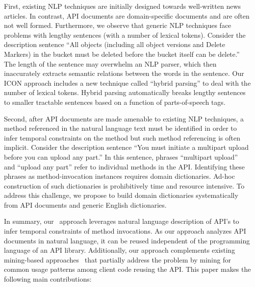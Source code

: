 First, existing NLP techniques are initially designed towards well-written news articles.
In contrast, API documents are domain-specific documents and are often not well formed.
Furthermore, we observe that generic NLP techniques face problems with lengthy sentences (with a number of lexical tokens).
Consider the description sentence ``All objects (including all object versions and Delete Markers) in the bucket must be deleted before the bucket itself can be delete.'' The length of the sentence may overwhelm an NLP parser, which then inaccurately extracts semantic relations between the words in the sentence.
Our ICON approach includes a new technique called ``hybrid parsing'' to deal with the number of lexical tokens.
Hybrid parsing automatically breaks lengthy sentences to smaller tractable sentences based on a function of parts-of-speech tags.   

Second, after API documents are made amenable to existing NLP techniques, a method referenced in the natural language text must be identified in order to infer temporal constraints on the method but such method referencing is often implicit.
Consider the description sentence ``You must initiate a multipart upload before you can upload any part.''
In this sentence, phrases ``multipart upload'' and ``upload any part'' refer to individual methods in the API.
Identifying these phrases as method-invocation instances requires domain dictionaries.
Ad-hoc construction of such dictionaries is prohibitively time and resource intensive.
To address this challenge, we propose to build domain dictionaries systematically from API documents and generic English dictionaries.  

In summary, our \tool\ approach leverages natural language description of API's to infer temporal constraints of method invocations.
As our approach analyzes API documents in natural language, it can be reused independent of the programming language of an API library.
Additionally, our approach complements existing mining-based approaches~\cite{buse2012synthesizing, thummalapenta07parseweb, Wang:2013:MSR, Zhong:2009:MMR} that partially address the problem by mining for common usage patterns among client code reusing the API.
This paper makes the following main contributions:

